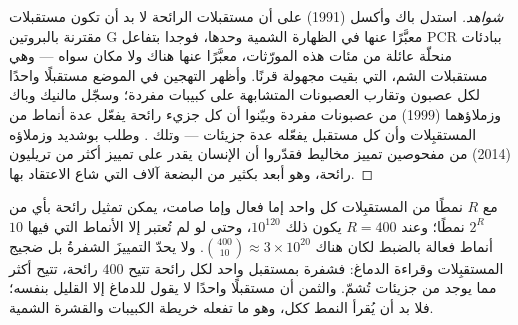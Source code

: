 \begin{proof}[شواهد]
استدل باك وأكسل (1991) على أن مستقبلات الرائحة لا بد أن
تكون مستقبلات مقترنة بالبروتين G معبَّرًا عنها في الظهارة
الشمية وحدها، فوجدا بتفاعل PCR ببادئات منحلّة عائلة من مئات
هذه المورّثات، معبَّرًا عنها هناك ولا مكان سواه --- وهي
مستقبلات الشم، التي بقيت مجهولة قرنًا. وأظهر التهجين في
الموضع مستقبلًا واحدًا لكل عصبون وتقارب العصبونات المتشابهة
على كبيبات مفردة؛ وسجّل مالنيك وباك وزملاؤهما (1999) من
عصبونات مفردة وبيّنوا أن كل جزيء رائحة يفعّل عدة أنماط من
المستقبِلات وأن كل مستقبل يفعّله عدة جزيئات --- وتلك . وطلب بوشديد وزملاؤه (2014) من مفحوصين تمييز
مخاليط فقدّروا أن الإنسان يقدر على تمييز أكثر من تريليون
رائحة، وهو أبعد بكثير من البضعة آلاف التي شاع الاعتقاد بها.
\end{proof}

\begin{proposition}\label{prop:b3:sensory-systems:combinatorial}
مع $R$ نمطًا من المستقبِلات كل واحد إما فعال وإما صامت، يمكن
تمثيل رائحة بأي من $2^{R}$ نمطًا؛ وعند $R = 400$ يكون ذلك
$10^{120}$، وحتى لو لم تُعتبر إلا الأنماط التي فيها $10$
أنماط فعالة بالضبط لكان هناك
$\binom{400}{10} \approx 3\times 10^{20}$. ولا يحدّ التمييزَ
الشفرةُ بل ضجيج المستقبِلات وقراءة الدماغ: فشفرة  بمستقبل واحد لكل رائحة تتيح $400$ رائحة،  تتيح أكثر مما يوجد من جزيئات تُشمّ. والثمن أن
مستقبلًا واحدًا لا يقول للدماغ إلا القليل بنفسه؛ فلا بد أن
يُقرأ النمط ككل، وهو ما تفعله خريطة الكبيبات والقشرة
الشمية.
\end{proposition}

